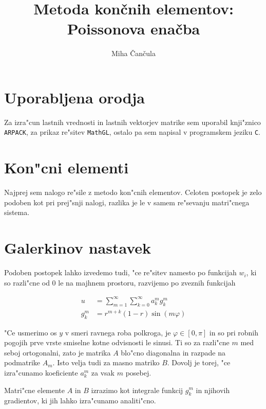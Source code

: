 \documentclass[a4paper,10pt]{article}
\title{Metoda kon\v cnih elementov: \\ Poissonova ena\v cba}
\author{Miha \v Can\v cula}
\renewcommand{\phi}{\varphi}
\begin{document}
\maketitle

\section{Uporabljena orodja}

Za izra"cun lastnih vrednosti in lastnih vektorjev matrike sem uporabil knji"znico \texttt{ARPACK}, za prikaz re"sitev \texttt{MathGL}, ostalo pa sem napisal v programskem jeziku \texttt{C}. 

\section{Kon"cni elementi}

Najprej sem nalogo re"sile z metodo kon"cnih elementov. Celoten postopek je zelo podoben kot pri prej"snji nalogi, razlika je le v samem re"sevanju matri"cnega sistema. 

\section{Galerkinov nastavek}
Podoben postopek lahko izvedemo tudi, "ce re"sitev namesto po funkcijah $w_i$, ki so razli"cne od 0 le na majhnem prostoru, razvijemo po zveznih funkcijah

\begin{align}
 u &= \sum_{m=1}^{\infty} \sum_{k=0}^{\infty} a_{k}^{m} g_{k}^{m} \\
 g_{k}^{m} &= r^{m+k} (1-r) \sin(m\phi)
\end{align}

"Ce usmerimo os $y$ v smeri ravnega roba polkroga, je $\phi \in [0,\pi]$ in so pri robnih pogojih prve vrste smiselne kotne odvisnosti le sinusi. Ti so za razli"cne $m$ med seboj ortogonalni, zato je matrika $A$ blo"cno diagonalna in razpade na podmatrike $A_m$. Isto velja tudi za masno matriko $B$. Dovolj je torej, "ce izra"cunamo koeficiente $a_{k}^{m}$ za vsak $m$ posebej. 

Matri"cne elemente $A$ in $B$ izrazimo kot integrale funkcij $g_{k}^{m}$ in njihovih gradientov, ki jih lahko izra"cunamo analiti"cno. 
\end{document}
